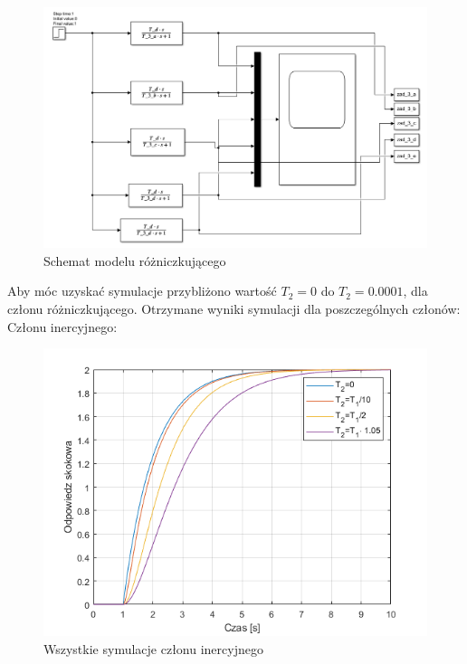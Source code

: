 \documentclass{article}
\begin{document}
\begin{figure}[h!]
    \centering
    \includegraphics[scale=0.6]{model_rozniczkujacy.png}
    \caption{Schemat modelu różniczkującego}
    \label{fig:model_rozniczkujacego}
\end{figure}
\newpage

Aby móc uzyskać symulacje przybliżono wartość $T_{2}=0$ do $T_{2}=0.0001$, dla członu różniczkującego.
Otrzymane wyniki symulacji dla poszczególnych członów:\\
Członu inercyjnego:
\begin{figure}[h!]
    \centering
    \includegraphics[scale=0.5]{all_inercyjny.png}
    \caption{Wszystkie symulacje członu inercyjnego}
    \label{fig:all_inercyjny}
\end{figure}
\end{document}
